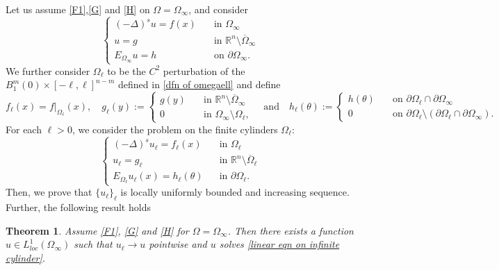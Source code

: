 \documentclass{amsart}
\newtheorem{theorem}{Theorem}[section]
\newcommand{\R}{\mathbb{R}}
\newcommand{\slap}{(-\Delta)^{s}}
\newcommand{\ul}{u_{\ell}}
\begin{document}
 
 Let us assume \ref{F1},\ref{G} and \ref{H} on $\Omega=\Omega_{\infty}$,  and consider 
\begin{equation}\label{linear eqn on infinite cylinder}
\begin{cases}
     \slap u=f(x) \quad &\text{in } \Omega_{\infty} \\
     u=g &\text{in }\R^{n}\setminus\overline{\Omega}_{\infty}\\
    E_{\Omega_{\infty}}u=h &\text{on }\partial\Omega_{\infty}.
\end{cases}
\end{equation}
We further consider $\Omega_{\ell}$ to be the $C^{2}$ perturbation of the $B_{1}^{m}(0)\times [-\ell,\ell]^{n-m}$ defined in \eqref{dfn of omegaell} and define 
\begin{equation}\label{dfn of g ell and h ell}
  f_{\ell}(x)=f|_{\Omega_{\ell}} (x),\quad  g_{\ell}(y):=\begin{cases}
        g(y) \quad &\text{in } \R^{n}\setminus\overline{\Omega}_{\infty}\\
        0 &\text{in }\Omega_{\infty}\setminus\Omega_{\ell},
    \end{cases} 
    \quad\text{and}\quad 
    h_{\ell}(\theta):=\begin{cases}
        h(\theta)\quad &\text{on }\partial\Omega_{\ell}\cap\partial\Omega_{\infty}\\
        0 &\text{on }\partial\Omega_{\ell}\setminus(\partial\Omega_{\ell}\cap\partial\Omega_{\infty}).
    \end{cases}
\end{equation}
For each $\ell>0$, we consider the problem on the finite cylinders $\Omega_{\ell}$:
\begin{equation}\label{solution on omega ell}
    \begin{cases}
         \slap \ul =f_{\ell}(x) \quad &\text{in }\Omega_{\ell}\\
        \ul=g_{\ell} &\text{in }\R^{n}\setminus\overline{\Omega}_{\ell}\\
        E_{\Omega_{\ell}}\ul(x)= h_{\ell}(\theta) &\text{in }  \partial\Omega_{\ell}.
    \end{cases}
\end{equation}
Then, we prove that $\{\ul\}_{\ell}$ is locally uniformly bounded and increasing sequence. Further, the following result holds
\begin{theorem}
    Assume \ref{F1}, \ref{G} and \ref{H} for $\Omega=\Omega_{\infty}$. Then there exists a function $u\in L_{loc}^{1}(\Omega_{\infty})$ such that $u_{\ell}\to u$ pointwise and $u$ solves \eqref{linear eqn on infinite cylinder}.
\end{theorem}
\end{document}
